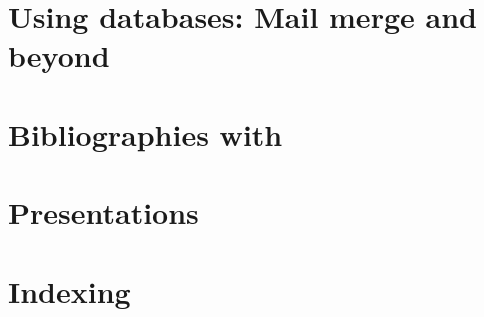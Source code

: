 \section{Using databases: Mail merge and beyond}

\section{Bibliographies with \protect{}}

\section{Presentations}

\section{Indexing}



